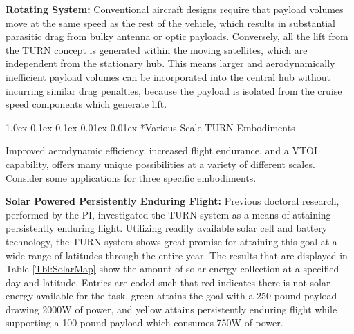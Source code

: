 \documentclass[11pt]{article}
\makeatletter
\renewcommand\subsection{
\@startsection{subsection}{2}{\z@}%
{1.0ex \@plus 0.1ex \@minus 0.1ex}%
{0.01ex \@plus 0.01ex}%
{\normalfont\Large\bfseries}}
\makeatother
\begin{document}
{\bf Rotating System:}
Conventional aircraft designs require that payload volumes move at the same speed as the rest of the vehicle, which results in substantial parasitic drag from bulky antenna or optic payloads.  Conversely, all the lift from the TURN concept is generated within the moving satellites, which are independent from the stationary hub.  This means larger and aerodynamically inefficient payload volumes can be incorporated into the central hub without incurring similar drag penalties, because the payload is isolated from the cruise speed components which generate lift.




\subsection*{Various Scale TURN Embodiments}

Improved aerodynamic efficiency, increased flight endurance, and a VTOL capability, offers many unique possibilities at a variety of different scales.  Consider some applications for three specific embodiments.


{\bf Solar Powered Persistently Enduring Flight:}
Previous doctoral research, performed by the PI, investigated the TURN system as a means of attaining persistently enduring flight.  Utilizing readily available solar cell and battery technology, the TURN system shows great promise for attaining this goal at a wide range of latitudes through the entire year.  The results that are displayed in Table \ref{Tbl:SolarMap} show the amount of solar energy collection at a specified day and latitude.  Entries are coded such that red indicates there is not solar energy available for the task, green attains the goal with a 250 pound payload drawing 2000W of power, and yellow attains persistently enduring flight while supporting a 100 pound payload which consumes 750W of power.
\end{document}
